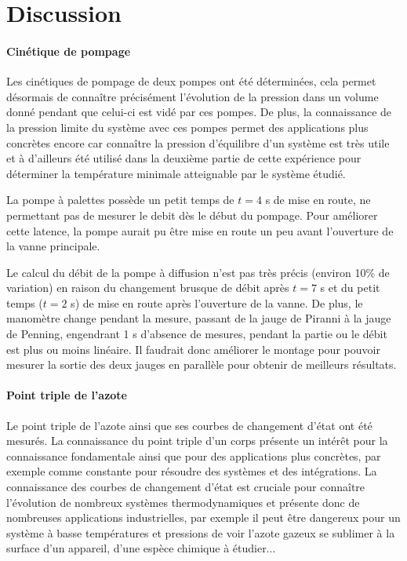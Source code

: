 \section{Discussion}

\paragraph{Cinétique de pompage}
Les cinétiques de pompage de deux pompes ont été déterminées, cela permet désormais de connaître précisément l'évolution de la pression dans un volume donné pendant que celui-ci est vidé par ces pompes. De plus, la connaissance de la pression limite du système avec ces pompes permet des applications plus concrètes encore car connaître la pression d'équilibre d'un système est très utile et à d'ailleurs été utilisé dans la deuxième partie de cette expérience pour déterminer la température minimale atteignable par le système étudié.

La pompe à palettes possède un petit temps de \(t = 4\) \si{\second} de mise en route, ne permettant pas de mesurer le debit dès le début du pompage. Pour améliorer cette latence, la pompe aurait pu être mise en route un peu avant l'ouverture de la vanne principale.

Le calcul du débit de la pompe à diffusion n'est pas très précis (environ 10\% de variation) en raison du changement brusque de débit après \(t = 7\) \si{\second} et du petit temps (\(t = 2\) \si{\second}) de mise en route après l'ouverture de la vanne. De plus, le manomètre change pendant la mesure, passant de la jauge de Piranni à la jauge de Penning, engendrant 1 \si{\second} d'absence de mesures, pendant la partie ou le débit est plus ou moins linéaire. Il faudrait donc améliorer le montage pour pouvoir mesurer la sortie des deux jauges en parallèle pour obtenir de meilleurs résultats.


\paragraph*{Point triple de l'azote}
Le point triple de l'azote ainsi que ses courbes de changement d'état ont été mesurés. La connaissance du point triple d'un corps présente un intérêt pour la connaissance fondamentale ainsi que pour des applications plus concrètes, par exemple comme constante pour résoudre des systèmes et des intégrations. La connaissance des courbes de changement d'état est cruciale pour connaître l'évolution de nombreux systèmes thermodynamiques et présente donc de nombreuses applications industrielles, par exemple il peut être dangereux pour un système à basse températures et pressions de voir l'azote gazeux se sublimer à la surface d'un appareil, d'une espèce chimique à étudier...

